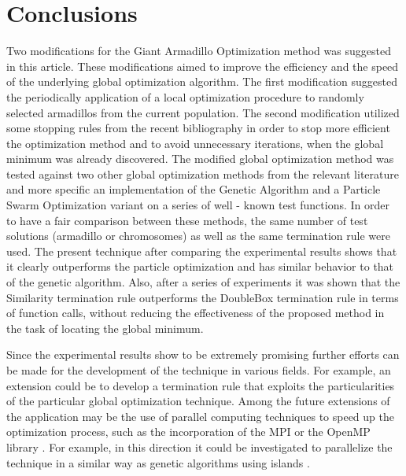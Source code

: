 \documentclass[journal,article,submit,pdftex,moreauthors]{Definitions/mdpi}
\begin{document}
\section{Conclusions}\label{sec:Conclusions}
Two modifications for the Giant Armadillo Optimization method was suggested in this article. These modifications aimed to improve the efficiency and the speed of the underlying global optimization algorithm. The first modification suggested the periodically application of a local optimization procedure to randomly selected armadillos from the current population. The second modification utilized some stopping rules from the recent bibliography in order to stop more efficient the optimization method and to avoid  unnecessary iterations, when the global minimum was already discovered. The modified global optimization method was tested against two other global optimization methods from the relevant literature and more specific an implementation of the Genetic Algorithm and a Particle Swarm Optimization variant on a series of well - known test functions. In order to have a fair comparison between these methods, the same number of test solutions (armadillo or chromosomes) as well as the same termination rule were used. The present technique after comparing the experimental results shows that it clearly outperforms the particle optimization and has similar behavior to that of the genetic algorithm. Also, after a series of experiments it was shown that the Similarity termination rule outperforms the DoubleBox termination rule in terms of function calls, without reducing the effectiveness of the proposed  method in the task of locating the global minimum.

Since the experimental results show to be extremely promising further efforts can be made for the development of the technique in various fields.  For example, an extension could be to develop a termination rule that exploits the particularities of the particular global optimization technique.
 Among the future extensions of the application may be the use of parallel computing techniques to speed up the optimization process, such as the incorporation of the MPI  \cite{openmpi}  or the  OpenMP library \cite{openmp}. For example, in this direction it could be investigated to parallelize the technique in a similar way as genetic algorithms using islands \cite{island1,island2}.\vspace{6pt} 

\end{document}
